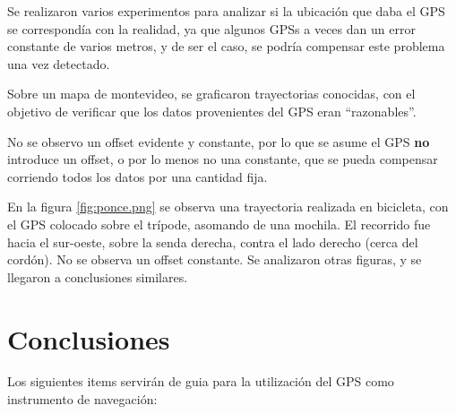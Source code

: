 \documentclass[spanish,12pt,a4paper,titlepage]{report}
\begin{document}
Se realizaron varios experimentos para analizar si la ubicación que daba el GPS se correspondía con la realidad, ya que algunos GPSs a veces dan un error constante de varios metros, y de ser el caso, se podría compensar este problema una vez detectado.

Sobre un mapa de montevideo, se graficaron trayectorias conocidas, con el objetivo de verificar que los datos provenientes del GPS eran ``razonables''.

No se observo un offset evidente y constante, por lo que se asume el GPS \textbf{no} introduce un offset, o por lo menos no una constante, que se pueda compensar corriendo todos los datos por una cantidad fija.

En la figura \ref{fig:ponce.png} se observa una trayectoria realizada en bicicleta, con el GPS colocado sobre el trípode, asomando de una mochila. El recorrido fue hacia el sur-oeste, sobre la senda derecha, contra el lado derecho (cerca del cordón). No se observa un offset constante. Se analizaron otras figuras, y se llegaron a conclusiones similares.

\newpage
\section{Conclusiones}
\label{sec:conclusion}

Los siguientes items servirán de guia para la utilización del GPS como instrumento de navegación:
\end{document}
